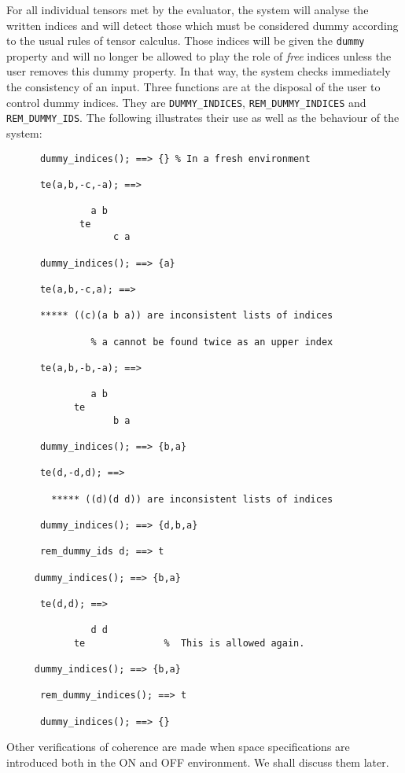 
For all individual tensors met by the evaluator, the system will analyse 
the written indices and will detect those which must be considered dummy 
according to the usual rules of tensor calculus. Those indices will be given
the \texttt{dummy} property and will no longer be allowed to play the role 
of \emph{free} indices unless the user removes this dummy property. 
In that way, the system checks immediately the consistency of an input. 
Three functions are at the disposal of the user to control dummy indices.
They are \texttt{DUMMY\_INDICES},
\texttt{REM\_DUMMY\_INDICES} and 
\texttt{REM\_DUMMY\_IDS}. 
The following illustrates their use as well as the behaviour of the 
system: 
\begin{verbatim}
      dummy_indices(); ==> {} % In a fresh environment

      te(a,b,-c,-a); ==>

               a b
             te
                   c a

      dummy_indices(); ==> {a}

      te(a,b,-c,a); ==>
              
      ***** ((c)(a b a)) are inconsistent lists of indices

               % a cannot be found twice as an upper index

      te(a,b,-b,-a); ==>

               a b
            te
                   b a

      dummy_indices(); ==> {b,a}

      te(d,-d,d); ==>
 
        ***** ((d)(d d)) are inconsistent lists of indices

      dummy_indices(); ==> {d,b,a}

      rem_dummy_ids d; ==> t

     dummy_indices(); ==> {b,a}

      te(d,d); ==>   
 
               d d
            te              %  This is allowed again.

     dummy_indices(); ==> {b,a}

      rem_dummy_indices(); ==> t

      dummy_indices(); ==> {}
\end{verbatim}
Other verifications of coherence are made when space specifications 
are introduced both in the ON and OFF  environment. We shall 
discuss them later.

